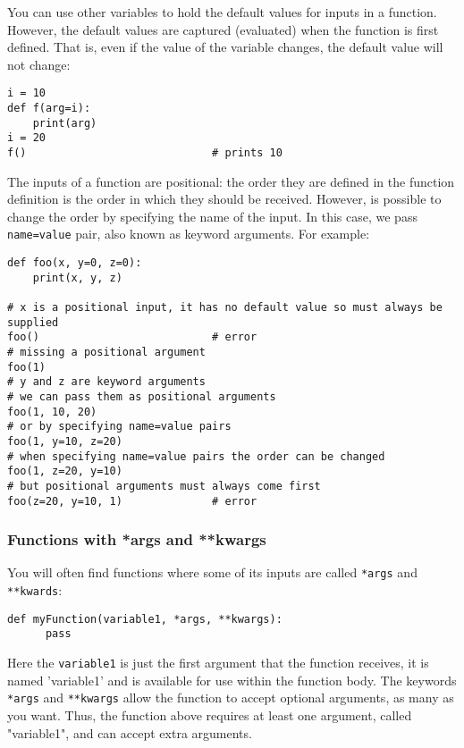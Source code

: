 \documentclass[12pt, a4paper]{article}
\begin{document}
You can use other variables to hold the default values for inputs in a function.
However, the default values are captured (evaluated) when the function is first defined.
That is, even if the value of the variable changes, the default value will not change:
\lstset{language=jupyter-python,label= ,caption= ,captionpos=b,numbers=none}
\begin{lstlisting}
i = 10
def f(arg=i):
    print(arg)
i = 20
f()                             # prints 10
\end{lstlisting}

The inputs of a function are positional: the order they are defined in the function definition is the order in which they should be received.
However, is possible to change the order by specifying the name of the input.
In this case, we pass \texttt{name=value} pair, also known as keyword arguments.
For example:
\lstset{language=jupyter-python,label= ,caption= ,captionpos=b,numbers=none}
\begin{lstlisting}
def foo(x, y=0, z=0):
    print(x, y, z)

# x is a positional input, it has no default value so must always be supplied
foo()                           # error
# missing a positional argument
foo(1)
# y and z are keyword arguments
# we can pass them as positional arguments
foo(1, 10, 20)
# or by specifying name=value pairs
foo(1, y=10, z=20)
# when specifying name=value pairs the order can be changed
foo(1, z=20, y=10)
# but positional arguments must always come first
foo(z=20, y=10, 1)              # error
\end{lstlisting}
\subsubsection{Functions with *args and **kwargs}
\label{sec:orgbdfe0a6}
You will often find functions where some of its inputs are called \texttt{*args} and \texttt{**kwards}:
\lstset{language=jupyter-python,label= ,caption= ,captionpos=b,numbers=none}
\begin{lstlisting}
def myFunction(variable1, *args, **kwargs):
      pass
\end{lstlisting}
Here the \texttt{variable1} is just the first argument that the function receives, it is named 'variable1' and is available for use within the function body.
The keywords \texttt{*args} and \texttt{**kwargs} allow the function to accept optional arguments, as many as you want.
Thus, the function above requires at least one argument, called "variable1", and can accept extra arguments.
\end{document}
